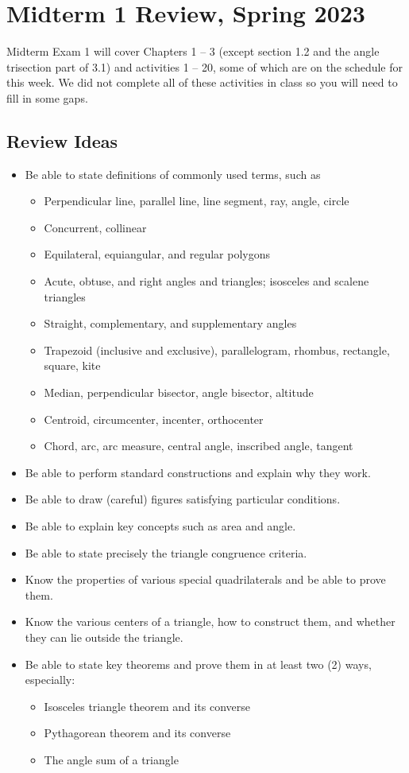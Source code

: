 \newpage

\section{Midterm 1 Review, Spring 2023}
Midterm Exam 1 will cover Chapters 1 -- 3 (except section 1.2 and the angle trisection part of 3.1) and activities 1 -- 20, some of which are on the schedule for this week.  We did not complete all of these activities in class so you will need to fill in some gaps.  
\subsection{Review Ideas}

\begin{itemize}\itemsep0em
\item Be able to state definitions of commonly used terms, such as 
\begin{itemize}
\item Perpendicular line, parallel line, line segment, ray, angle, circle
\item Concurrent, collinear
\item Equilateral, equiangular, and regular polygons
\item Acute, obtuse, and right angles and triangles; isosceles and scalene triangles
\item Straight, complementary, and supplementary angles
\item Trapezoid (inclusive and exclusive), parallelogram, rhombus, rectangle, square, kite
\item Median, perpendicular bisector, angle bisector, altitude
\item Centroid, circumcenter, incenter, orthocenter
\item Chord, arc, arc measure, central angle, inscribed angle, tangent
\end{itemize}
\item Be able to perform standard constructions and explain why they work. 
\item Be able to draw (careful) figures satisfying particular conditions.  
\item Be able to explain key concepts such as area and angle.   
\item Be able to state precisely the triangle congruence criteria. 
\item Know the properties of various special quadrilaterals and be able to prove them.  
\item Know the various centers of a triangle, how to construct them, and whether they can lie outside the triangle.  
\item Be able to state key theorems and prove them in at least two (2) ways, especially:  
\begin{itemize}
\item Isosceles triangle theorem and its converse
\item Pythagorean theorem and its converse
\item The angle sum of a triangle 
\end{itemize}
\end{itemize}

